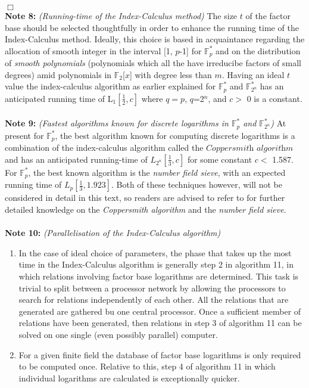 \documentclass[iwp,first]{luthesis}
\begin{document}
\hfill $\Box$
\\
\textbf{Note 8:} \textit{(Running-time of the Index-Calculus method)} The size $t$ of the factor base should be selected thoughtfully in order to enhance the running time of the Index-Calculus method. Ideally, this choice is based in acquaintance regarding the allocation of smooth integer in the interval [1, $p$-1] for $\mathbb{F}_{p}^{*}$ and on the distribution of \textit{smooth polynomials} (polynomials which all the have irreducibe factors of small degrees) amid polynomials in $\mathbb{F}_{2}$[$x$] with degree less than $m$. Having an ideal $t$ value the index-calculus algorithm as earlier explained for $\mathbb{F}_{p}^{*}$ and $\mathbb{F}_{2^n}^{*}$ has an anticipated running time of L$_{1}[\frac{1}{2}, c]$ where $q=p$, $q$=2$^n$, and $c >$ 0 is a constant.
\\
\\
\textbf{Note 9:} \textit{(Fastest algorithms known for discrete logarithms in $\mathbb{F}_{p}^{*}$ and $\mathbb{F}_{2^n}^{*}$)} At present for $\mathbb{F}_{p}^{*}$, the best algorithm known for computing discrete logarithms is a combination of the index-calculus algorithm called the $\textit{Coppersmith algorithm}$ and has an anticipated running-time of $L_{2^n}[\frac{1}{3},c]$ for some constant $c <$ 1.587. For $\mathbb{F}_{p}^{*}$, the best known algorithm is the \textit{number field sieve}, with an expected running time of $L_p[\frac{1}{3},1.923]$. Both of these techniques however, will not be considered in detail in this text, so readers are advised to refer to \cite{BSc} for further detailed knowledge on the \textit{Coppersmith algorithm} and the \textit{number field sieve}.
\\
\\
\textbf{Note 10:} \textit{(Parallelisation of the Index-Calculus algorithm)} 

\begin{enumerate}

\item In the case of ideal choice of parameters, the phase that takes up the most time in the Index-Calculus algorithm is generally step 2 in algorithm 11, in which relations involving factor base logarithms are determined. This task is trivial to split between a processor network by allowing the processors to search for relations independently of each other. All the relations that are generated are gathered bu one central processor. Once a sufficient member of relations have been generated, then relations in step 3 of algorithm 11 can be solved on one single (even possibly parallel) computer.

\item For a given finite field the database of factor base logarithms is only required to be computed once. Relative to this, step 4 of algorithm 11 in which individual logarithms are calculated is exceptionally quicker.

\end{enumerate}
\end{document}
